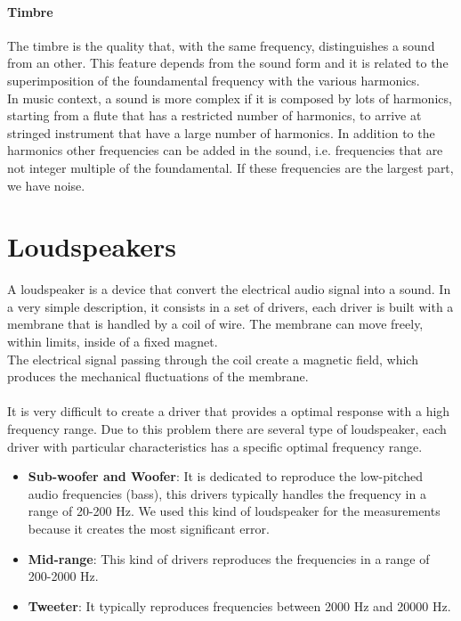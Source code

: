 \paragraph{Timbre}
The timbre is the quality that, with the same frequency, distinguishes a sound from an other. This feature depends from the sound form and it is related to the superimposition of the foundamental frequency with the various harmonics.\\
In music context, a sound is more complex if it is composed by lots of harmonics, starting from a flute that has a restricted number of harmonics, to arrive at stringed instrument that have a large number of harmonics. In addition to the harmonics other frequencies can be added in the sound, i.e. frequencies that are not integer multiple of the foundamental. If these frequencies are the largest part, we have noise. 

\section{Loudspeakers}
A loudspeaker is a device that convert the electrical audio signal into a sound. In a very simple description, it consists in a set of drivers, each driver is built with a membrane that is handled by a coil of wire. 
The membrane can move freely, within limits, inside of a fixed magnet.\\
The electrical signal passing through the coil create a magnetic field, which produces the mechanical fluctuations of the membrane.\\\\
It is very difficult to create a driver that provides a optimal response with a high frequency range. Due to this problem there are several type of loudspeaker, each driver with particular characteristics has a specific optimal frequency range.
\begin{itemize}
\item \textbf{Sub-woofer and Woofer}: It is dedicated to reproduce the low-pitched audio frequencies (bass), this drivers typically handles the frequency in a range of 20-200 Hz. We used this kind of loudspeaker for the measurements because it creates the most significant error.
\item \textbf{Mid-range}: This kind of drivers reproduces the frequencies in a range of 200-2000 Hz.
\item \textbf{Tweeter}: It typically reproduces frequencies between 2000 Hz and 20000 Hz.
\end{itemize}

